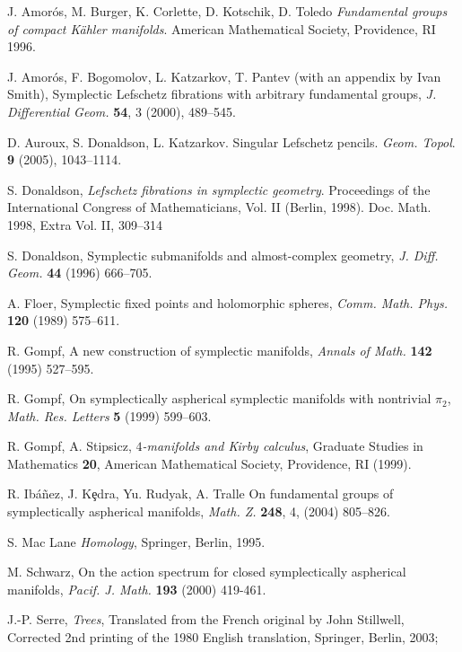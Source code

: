 \documentclass[12pt]{amsart}
\theoremstyle{definition}
\theoremstyle{remark}
\numberwithin{figure}{section}
\numberwithin{table}{section}
\numberwithin{equation}{section}
\begin{document}
\begin{thebibliography}{ABCDE}





J. Amor\'os, M. Burger, K. Corlette, D. Kotschik, D. Toledo
{\it Fundamental groups of compact K\"ahler manifolds}. American
Mathematical  Society, Providence, RI 1996.


J. Amor{\'o}s, F. Bogomolov, L. Katzarkov, T. Pantev (with an appendix
by Ivan Smith), Symplectic Lefschetz fibrations with arbitrary
fundamental groups, {\it J. Differential Geom.} {\bf 54}, 3 (2000), 489--545.


D. Auroux,  S. Donaldson, L. Katzarkov. Singular Lefschetz pencils.
{\it Geom. Topol}. {\bf 9} (2005), 1043--1114.


S. Donaldson, {\it Lefschetz fibrations in symplectic geometry}.
Proceedings of the International Congress of Mathematicians, Vol. II (Berlin, 
1998).
Doc. Math. 1998, Extra Vol. II, 309--314              


S. Donaldson, Symplectic submanifolds and almost-complex geometry,
{\it J. Diff. Geom.} {\bf 44} (1996) 666--705.


A. Floer, Symplectic fixed points and holomorphic spheres,
{\it Comm. Math. Phys.}
{\bf  120} (1989) 575--611.


R. Gompf, A new construction of symplectic manifolds, 
{\it Annals of Math.}
{\bf  142} (1995) 527--595.


R. Gompf, On symplectically aspherical symplectic manifolds with nontrivial 
$\pi_2$, {\it Math. Res. Letters} {\bf  5} (1999) 599--603.


R. Gompf, A. Stipsicz, {\it {$4$}-manifolds and Kirby calculus},
Graduate Studies in  Mathematics {\bf 20}, American Mathematical
Society, Providence, RI (1999).

R. Ib{\'a}{\~n}ez, J. K{\c{e}}dra, Yu. Rudyak, A. Tralle
On fundamental groups of symplectically aspherical manifolds, {\it Math. Z.} {\bf 248}, 4, (2004) 
805--826.

S. Mac Lane {\it Homology}, Springer, Berlin, 1995.

M. Schwarz, On the action spectrum for closed symplectically 
aspherical manifolds, {\it Pacif. J. Math.} {\bf 193} (2000) 419-461.

J.-P. Serre, {\it Trees}, Translated from the French original by John Stillwell, 
Corrected 2nd printing of the 1980 English translation, Springer, Berlin, 2003; 


\end{thebibliography}
\end{document}
